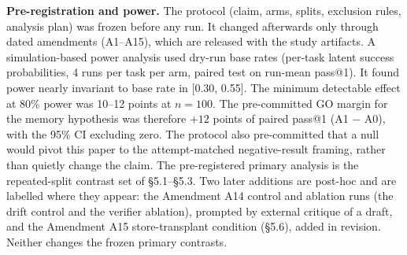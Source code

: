 \documentclass[sigconf, nonacm]{acmart}
\begin{document}
\textbf{Pre-registration and power.} The protocol (claim, arms, splits, exclusion rules, analysis plan) was frozen before any run. It changed afterwards only through dated amendments (A1--A15), which are released with the study artifacts. A simulation-based power analysis used dry-run base rates (per-task latent success probabilities, 4 runs per task per arm, paired test on run-mean pass@1). It found power nearly invariant to base rate in [0.30, 0.55]. The minimum detectable effect at 80\% power was 10--12 points at $n = 100$. The pre-committed GO margin for the memory hypothesis was therefore $+12$ points of paired pass@1 (A1 $-$ A0), with the 95\% CI excluding zero. The protocol also pre-committed that a null would pivot this paper to the attempt-matched negative-result framing, rather than quietly change the claim. The pre-registered primary analysis is the repeated-split contrast set of \S5.1--\S5.3. Two later additions are post-hoc and are labelled where they appear: the Amendment A14 control and ablation runs (the drift control and the verifier ablation), prompted by external critique of a draft, and the Amendment A15 store-transplant condition (\S5.6), added in revision. Neither changes the frozen primary contrasts.
\end{document}
